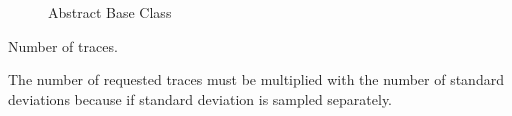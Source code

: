 \documentclass[letterpaper,10pt,english]{sphinxmanual}
\begin{document}
\begin{fulllineitems}
\begin{fulllineitems}
\begin{quote}
\begin{description}
\end{description}\end{quote}

\end{fulllineitems}




\begin{description}
\item[{}] \leavevmode
Abstract Base Class

\end{description}



\begin{fulllineitems}
\label{\detokenize{qsim:qsim.noise.NTGQuasiStatic.n_traces}}
Number of traces.

The number of requested traces must be multiplied with the number of
standard deviations because if standard deviation is sampled
separately.

\end{fulllineitems}


\end{fulllineitems}

\end{document}
